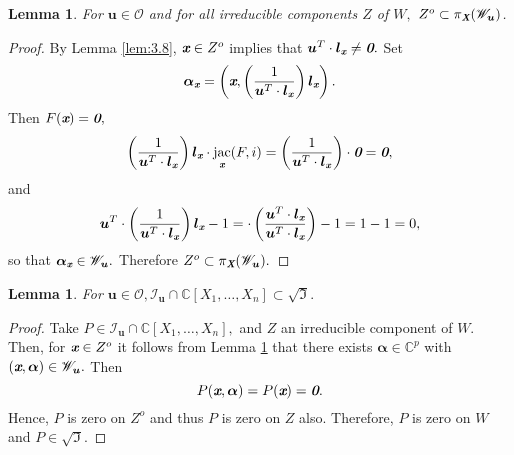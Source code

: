 \documentclass[a4paper]{article}
\def\bz{\textit{\textbf{0}}}
\def\Xb{\textit{\textbf{X}}}
\def\mA{{\bm A}}
\def\ub{{\bm u}}
\def\lb{{\bm l}}
\def\lxb{{\bm l_{\xb}}}
\def\ax{\bm \alpha_{\xb}}
\def\xb{\textit{\textbf{x}}}
\DeclareMathOperator{\jac}{jac}
\def\C{\mathbb{C}}
\def\I{\mathfrak{I}}
\def\Ir{\sqrt{\mathfrak{I}}}
\def\ji{\jac_{\xb}(F,i)}
\def\Il{\mathscr{I}_{\ub}}
\def\Wl{\mathscr{W}_{\ub}}
\newtheorem{lemma}[theorem]{Lemma}
\begin{document}
%
\begin{lemma}\label{lem:3.9}
For $\ub \in \mathscr{O}$ and for all irreducible components $Z$ of $W,$ $Z^o \subset \pi_{\Xb}(\Wl)$.
\end{lemma}
%
\begin{proof}
By Lemma \ref{lem:3.8}, $\xb \in Z^o$ implies that $\ub^T \cdot \lb_{\xb} \not = \bz.$ Set
\[
\bm \alpha_{\xb} = \left(\xb,\left(\frac{1}{\ub^T\cdot \lb_{\xb}}\right)\lb_{\xb}\right). 
\]
Then $F(\xb)=\bz,$
\begin{align*}
    \left(\frac{1}{\ub^T\cdot \lb_{\xb}}\right)\lxb\cdot \ji = \left(\frac{1}{\ub^T\cdot \lb_{\xb}}\right)\cdot \bz = \bz,
\end{align*}
and
\[
\ub^T\cdot\left(\frac{1}{\ub^T\cdot \lxb}\right)\lxb-1 =
    \cdot\left(\frac{\ub^T\cdot\lxb}{\ub^T\cdot \lxb}\right)-1=1-1=0,
\]
so that $\ax \in \Wl.$ Therefore $Z^o \subset \pi_{\Xb}(\Wl).$
%
\end{proof}
%
\begin{lemma}\label{lem:3.10}
For $\ub \in \mathscr{O}, \Il \cap \C[X_1,\hdots,X_n] \subset \Ir.$
\end{lemma}
%
\begin{proof}
%
Take $P \in \Il\cap \C[X_1,\hdots,X_n],$ and $Z$ an irreducible component of $W.$ Then, for $\xb \in Z^o$ it follows from Lemma \ref{lem:3.9} that there exists $\bm \alpha \in \C^p$ with $(\xb, \bm \alpha) \in \Wl.$ Then 
\[
P(\xb, \bm \alpha) = P(\xb) = \bz.
\]
Hence, $P$ is zero on $Z^o$ and thus $P$ is zero on $Z$ also. Therefore, $P$ is zero on $W$ and $P \in \Ir.$ 
%
\end{proof}


\end{document}
